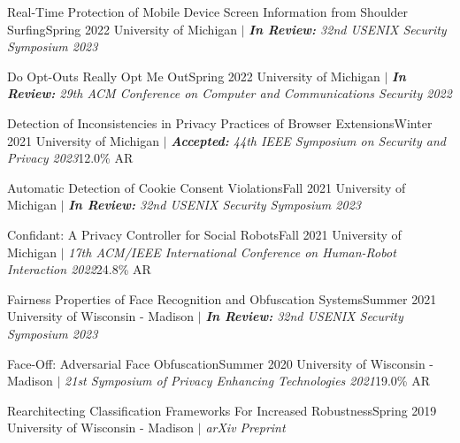
    \CVSubheading
      {{Real-Time Protection of Mobile Device Screen Information from Shoulder Surfing}\cite{ShoulderSurfing}}{Spring 2022}
      {{University of Michigan} $|$ \emph{\small{\textbf{In Review:} 32nd USENIX Security Symposium 2023}}}{}

    \CVSubheading
      {{Do Opt-Outs Really Opt Me Out}\cite{OptOutChk}}{Spring 2022}
      {{University of Michigan} $|$ \emph{\small{\textbf{In Review:} 29th ACM Conference on Computer and Communications Security 2022}}}{}

    \CVSubheading
      {{Detection of Inconsistencies in Privacy Practices of Browser Extensions}\cite{BrowserExtensions}}{Winter 2021}
      {{University of Michigan} $|$ \emph{\small{\textbf{Accepted:} 44th IEEE Symposium on Security and Privacy 2023}}}{12.0\% AR}

    \CVSubheading
      {{Automatic Detection of Cookie Consent Violations}\cite{ConsentChk}}{Fall 2021}
      {{University of Michigan} $|$ \emph{\small{\textbf{In Review:} 32nd USENIX Security Symposium 2023}}}{}

    \CVSubheading
      {{Confidant: A Privacy Controller for Social Robots}\cite{HRIPrivacy}}{Fall 2021}
      {{University of Michigan} $|$ \emph{\small{17th ACM/IEEE International Conference on Human-Robot Interaction 2022}}}{24.8\% AR}
      
      
      
    \CVSubheading
      {{Fairness Properties of Face Recognition and Obfuscation Systems}\cite{Fairness}}{Summer 2021}
      {{University of Wisconsin - Madison} $|$ \emph{\small{\textbf{In Review:} 32nd USENIX Security Symposium 2023}}}{}

    \CVSubheading
      {{Face-Off: Adversarial Face Obfuscation}\cite{FaceOff}}{Summer 2020}
      {{University of Wisconsin - Madison} $|$ \emph{\small{21st Symposium of Privacy Enhancing Technologies 2021}}}{19.0\% AR}


    \CVSubheading
      {{Rearchitecting Classification Frameworks For Increased Robustness}\cite{Robustness}}{Spring 2019}
      {{University of Wisconsin - Madison} $|$ \emph{\small{arXiv Preprint}}}{}

  \CVSubHeadingListEnd